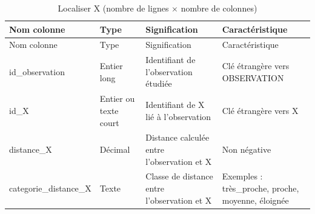 \documentclass[mstat,12pt]{unswthesis}
\begin{document}
\begin{longtable}[]{@{}
  >{\centering\arraybackslash}p{}
  >{\centering\arraybackslash}p{}
  >{\centering\arraybackslash}p{}
  >{\centering\arraybackslash}p{}@{}}
\caption{Localiser X (nombre de lignes \(\times\) nombre de
colonnes)}\tabularnewline
\toprule\noalign{}
\begin{minipage}[b]{\linewidth}\centering
Nom colonne
\end{minipage} & \begin{minipage}[b]{\linewidth}\centering
Type
\end{minipage} & \begin{minipage}[b]{\linewidth}\centering
Signification
\end{minipage} & \begin{minipage}[b]{\linewidth}\centering
Caractéristique
\end{minipage} \\
\midrule\noalign{}
\endfirsthead
\toprule\noalign{}
\begin{minipage}[b]{\linewidth}\centering
Nom colonne
\end{minipage} & \begin{minipage}[b]{\linewidth}\centering
Type
\end{minipage} & \begin{minipage}[b]{\linewidth}\centering
Signification
\end{minipage} & \begin{minipage}[b]{\linewidth}\centering
Caractéristique
\end{minipage} \\
\midrule\noalign{}
\endhead
\bottomrule\noalign{}
\endlastfoot
id\_observation & Entier long & Identifiant de l'observation étudiée &
Clé étrangère vers OBSERVATION \\
id\_X & Entier ou texte court & Identifiant de X lié à l'observation &
Clé étrangère vers X \\
distance\_X & Décimal & Distance calculée entre l'observation et X & Non
négative \\
categorie\_distance\_X & Texte & Classe de distance entre l'observation
et X & Exemples : très\_proche, proche, moyenne, éloignée \\
\end{longtable}

\endgroup
\end{document}
